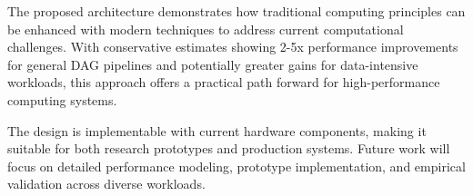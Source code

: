 \documentclass[11pt,a4paper]{article}
\begin{document}
The proposed architecture demonstrates how traditional computing principles can be enhanced with modern techniques to address current computational challenges. With conservative estimates showing 2-5x performance improvements for general DAG pipelines and potentially greater gains for data-intensive workloads, this approach offers a practical path forward for high-performance computing systems.

The design is implementable with current hardware components, making it suitable for both research prototypes and production systems. Future work will focus on detailed performance modeling, prototype implementation, and empirical validation across diverse workloads.



\end{document}
